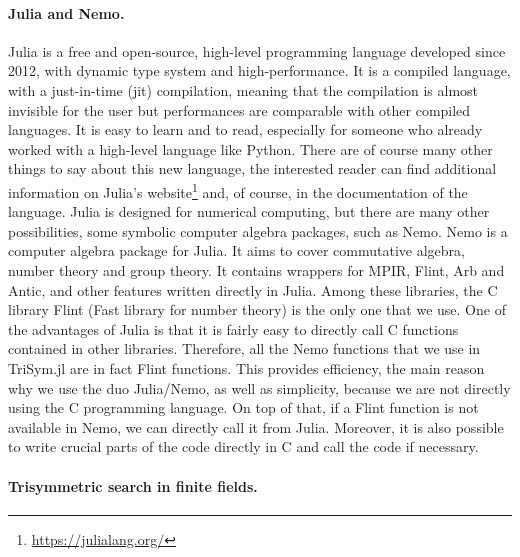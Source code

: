 \paragraph{Julia and Nemo.} Julia is a free and open-source, high-level programming language
developed since 2012, with dynamic type system and high-performance. It is
a compiled language, with a just-in-time (jit) compilation, meaning that the
compilation is almost invisible for the user but performances are comparable
with other compiled languages. It is easy to learn and to read, especially
for someone who already worked with a high-level language like Python.
There are of course many other things to say about this new language, the
interested reader can find additional information on Julia’s
website\footnote{\url{https://julialang.org/}} and, of
course, in the documentation of the language. Julia is designed for numerical
computing, but there are many other possibilities, \eg some symbolic computer algebra packages, such as
Nemo. Nemo is a computer algebra package for Julia. It aims to cover
commutative algebra, number theory and group theory. It contains wrappers
for MPIR, Flint, Arb and Antic, and other features written directly in Julia. Among
these libraries, the C library Flint (Fast library for number theory) is the
only one that we use.
One of the advantages of Julia is that it is fairly easy
to directly call C functions contained in other libraries. Therefore, all the
Nemo functions that we use in TriSym.jl are in fact Flint functions. This
provides efficiency, the main reason why we use the duo Julia/Nemo, as well
as simplicity, because we are not directly using the C programming language.
On top of that, if a Flint function is not available in Nemo, we can directly
call it from Julia. Moreover, it is also possible to write crucial parts of the code
directly in C and call the code if necessary.

\paragraph{Trisymmetric search in finite fields.}

